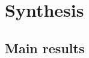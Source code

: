 	
\chapter{Synthesis}
\label{chap:synth}
\newpage



\section{Main results}
\label{sec:synth:mainres}
\newpage













